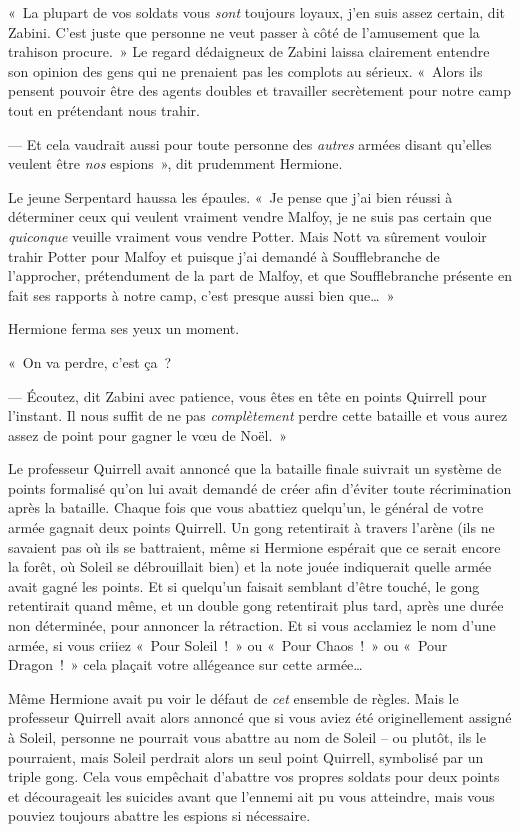 «~La plupart de vos soldats vous \emph{sont} toujours loyaux, j'en suis assez certain, dit Zabini.
C'est juste que personne ne veut passer à côté de l'amusement que la trahison procure.~»
Le regard dédaigneux de Zabini laissa clairement entendre son opinion des gens qui ne prenaient pas les complots au sérieux.
«~Alors ils pensent pouvoir être des agents doubles et travailler secrètement pour notre camp tout en prétendant nous trahir.

--- Et cela vaudrait aussi pour toute personne des \emph{autres} armées disant qu'elles veulent être \emph{nos} espions~», dit prudemment Hermione.

Le jeune Serpentard haussa les épaules.
«~Je pense que j'ai bien réussi à déterminer ceux qui veulent vraiment vendre Malfoy, je ne suis pas certain que \emph{quiconque} veuille vraiment vous vendre Potter.
Mais Nott va sûrement vouloir trahir Potter pour Malfoy et puisque j'ai demandé à Soufflebranche de l'approcher, prétendument de la part de Malfoy, et que Soufflebranche présente en fait ses rapports à notre camp, c'est presque aussi bien que…~»

Hermione ferma ses yeux un moment.

«~On va perdre, c'est ça~?

--- Écoutez, dit Zabini avec patience, vous êtes en tête en points Quirrell pour l'instant.
Il nous suffit de ne pas \emph{complètement} perdre cette bataille et vous aurez assez de point pour gagner le vœu de Noël.~»

Le professeur Quirrell avait annoncé que la bataille finale suivrait un système de points formalisé qu'on lui avait demandé de créer afin d'éviter toute récrimination après la bataille.
Chaque fois que vous abattiez quelqu'un, le général de votre armée gagnait deux points Quirrell.
Un gong retentirait à travers l'arène (ils ne savaient pas où ils se battraient, même si Hermione espérait que ce serait encore la forêt, où Soleil se débrouillait bien) et la note jouée indiquerait quelle armée avait gagné les points.
Et si quelqu'un faisait semblant d'être touché, le gong retentirait quand même, et un double gong retentirait plus tard, après une durée non déterminée, pour annoncer la rétraction.
Et si vous acclamiez le nom d'une armée, si vous criiez «~Pour Soleil~!~»
ou «~Pour Chaos~!~»
ou «~Pour Dragon~!~»
 cela plaçait votre allégeance sur cette armée…

Même Hermione avait pu voir le défaut de \emph{cet} ensemble de règles.
Mais le professeur Quirrell avait alors annoncé que si vous aviez été originellement assigné à Soleil, personne ne pourrait vous abattre au nom de Soleil -- ou plutôt, ils le pourraient, mais Soleil perdrait alors un seul point Quirrell, symbolisé par un triple gong.
Cela vous empêchait d'abattre vos propres soldats pour deux points et décourageait les suicides avant que l'ennemi ait pu vous atteindre, mais vous pouviez toujours abattre les espions si nécessaire.

